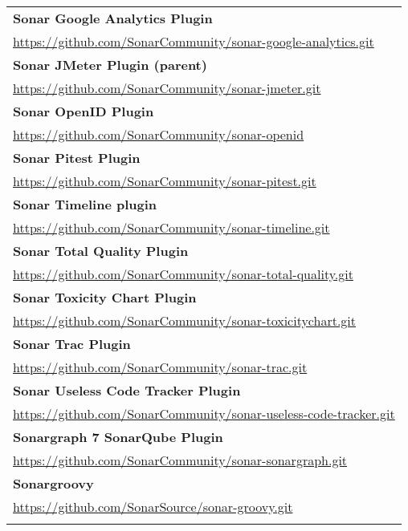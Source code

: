 \begin{table}[]
\small
\begin{tabular}{|p{130mm}|}
\hline 
\bf Sonar Google Analytics Plugin                      \\ \url{https://github.com/SonarCommunity/sonar-google-analytics.git}                 \\ \hline \bf
Sonar JMeter Plugin (parent)                       \\ \url{https://github.com/SonarCommunity/sonar-jmeter.git}                           \\ \hline \bf
Sonar OpenID Plugin                                \\ \url{https://github.com/SonarCommunity/sonar-openid}                               \\ \hline \bf
Sonar Pitest Plugin                                \\ \url{https://github.com/SonarCommunity/sonar-pitest.git}                           \\ \hline \bf
Sonar Timeline plugin                              \\ \url{https://github.com/SonarCommunity/sonar-timeline.git}                         \\ \hline \bf 
Sonar Total Quality Plugin                         \\ \url{https://github.com/SonarCommunity/sonar-total-quality.git}                    \\ \hline \bf
Sonar Toxicity Chart Plugin                        \\ \url{https://github.com/SonarCommunity/sonar-toxicitychart.git}                    \\ \hline \bf
Sonar Trac Plugin                                  \\ \url{https://github.com/SonarCommunity/sonar-trac.git}                             \\ \hline \bf
Sonar Useless Code Tracker Plugin                  \\ \url{https://github.com/SonarCommunity/sonar-useless-code-tracker.git}             \\ \hline \bf
Sonargraph 7 SonarQube Plugin                      \\ \url{https://github.com/SonarCommunity/sonar-sonargraph.git}                       \\ \hline \bf
Sonargroovy                                        \\ \url{https://github.com/SonarSource/sonar-groovy.git}                              \\ \hline \bf

\end{tabular}
\end{table}
